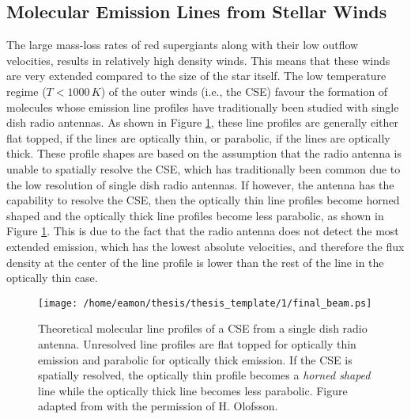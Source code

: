 \subsection{Molecular Emission Lines from Stellar Winds}\label{sec:1.8.5}
The large mass-loss rates of red supergiants along with their low outflow velocities, results in relatively high density winds. This means that these winds are very extended compared to the size of the star itself. The low temperature regime ($T< 1000\,K$) of the outer winds (i.e., the CSE) favour the formation of molecules whose emission line profiles have traditionally been studied with single dish radio antennas. As shown in Figure \ref{fig:1.8.5}, these line profiles are generally either flat topped, if the lines are optically thin, or parabolic, if the lines are optically thick. These profile shapes are based on the assumption that the radio antenna is unable to spatially resolve the CSE, which has traditionally been common due to the low resolution of single dish radio antennas. If however, the antenna has the capability to resolve the CSE, then the optically thin line profiles become horned shaped and the optically thick line profiles become less parabolic, as shown in Figure \ref{fig:1.8.5}. This is due to the fact that the radio antenna does not detect the most extended emission, which has the lowest absolute velocities, and therefore the flux density at the center of the line profile is lower than the rest of the line in the optically thin case.

\begin{figure}[hbt!]
\centering 
          \texttt{[image: /home/eamon/thesis/thesis\_template/1/final\_beam.ps]}
\caption[Theoretical molecular line profiles]{Theoretical molecular line profiles of a CSE from a single dish radio antenna. Unresolved line profiles are flat topped for optically thin emission and parabolic for optically thick emission. If the CSE is spatially resolved, the optically thin profile becomes a \textit{horned shaped} line while the optically thick line becomes less parabolic. Figure adapted from \cite{dalgarno_1987} with the permission of H. Olofsson.}
\label{fig:1.8.5}
\end{figure}

